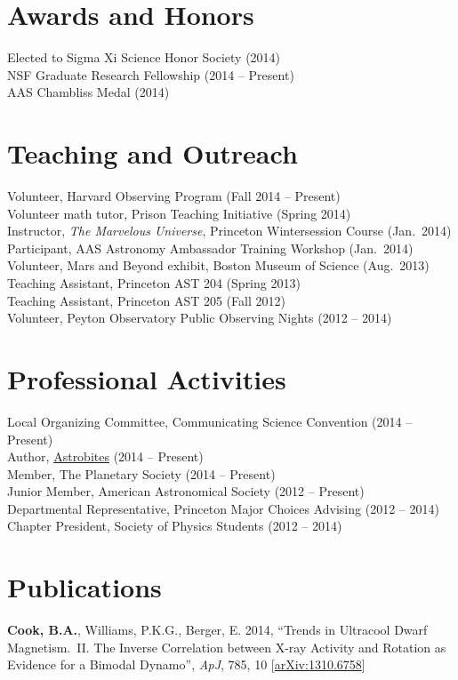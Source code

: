 \documentclass{res}
\begin{document}
\begin{resume}
\section{\textbf{Awards and Honors}}
\vspace{.1in}
Elected to Sigma Xi Science Honor Society (2014)\\
NSF Graduate Research Fellowship (2014 -- Present)\\
AAS Chambliss Medal (2014)


\section{\textbf{Teaching and Outreach}} 
\vspace{.1in}
Volunteer, Harvard Observing Program (Fall 2014 -- Present)\\
Volunteer math tutor, Prison Teaching Initiative (Spring 2014)\\
Instructor, \textit{The Marvelous Universe}, Princeton Wintersession Course (Jan.~2014)\\
Participant, AAS Astronomy Ambassador Training Workshop (Jan.~2014)\\
Volunteer, Mars and Beyond exhibit, Boston Museum of Science (Aug.~2013)\\
Teaching Assistant, Princeton AST 204 (Spring 2013)\\
Teaching Assistant, Princeton AST 205 (Fall 2012)\\
Volunteer, Peyton Observatory Public Observing Nights (2012
-- 2014)

\section{\textbf{Professional Activities}}
\vspace{0.1in}
Local Organizing Committee, Communicating Science Convention (2014 -- Present)\\
Author, \href{http://www.astrobites.org}{Astrobites} (2014 -- Present)\\
Member, The Planetary Society (2014 -- Present)\\
Junior Member, American Astronomical Society (2012 -- Present)\\
Departmental Representative, Princeton Major Choices Advising (2012 -- 2014)\\
Chapter President, Society of Physics Students (2012 -- 2014)

\section{\textbf{Publications}}
\vspace{.1in} \textbf{Cook, B.A.}, Williams, P.K.G., Berger, E. 2014,
``Trends in Ultracool Dwarf Magnetism.~II. The Inverse Correlation
between X-ray Activity and Rotation as Evidence for a Bimodal
Dynamo'', \textit{ApJ}, 785, 10
[\href{http://arxiv.org/abs/1310.6758}{arXiv:1310.6758}]


\end{resume}
\end{document}

